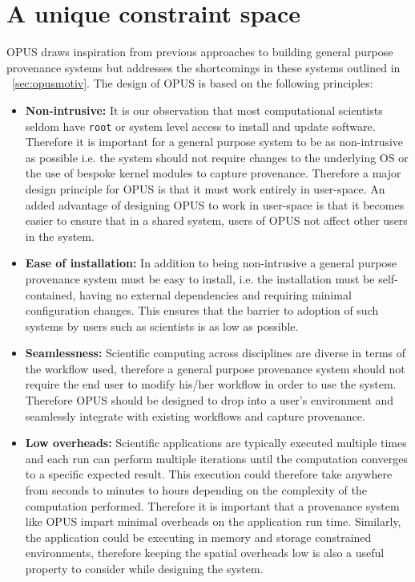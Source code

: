 \documentclass[withindex,glossary]{cam-thesis}
\begin{document}
\section{A unique constraint space}
OPUS draws inspiration from previous approaches to building general purpose provenance systems but addresses the shortcomings in these systems outlined in ~\ref{sec:opusmotiv}. The design of OPUS is based on the following principles:

\begin{itemize}

\item \textbf{Non-intrusive:}
It is our observation that most computational scientists seldom have \texttt{root} or system level access to install and update software. Therefore it is important for a general purpose system to be as non-intrusive as possible i.e. the system should not require changes to the underlying OS or the use of bespoke kernel modules to capture provenance. Therefore a major design principle for OPUS is that it must work entirely in user-space. An added advantage of designing OPUS to work in user-space is that it becomes easier to ensure that in a shared system, users of OPUS not affect other users in the system.

\item \textbf{Ease of installation:}
In addition to being non-intrusive a general purpose provenance system must be easy to install, i.e. the installation must be self-contained, having no external dependencies and requiring minimal configuration changes. This ensures that the barrier to adoption of such systems by users such as scientists is as low as possible.

\item \textbf{Seamlessness:}
Scientific computing across disciplines are diverse in terms of the workflow used, therefore a general purpose provenance system should not require the end user to modify his/her workflow in order to use the system. Therefore OPUS should be designed to drop into a user's environment and seamlessly integrate with existing workflows and capture provenance.

\item \textbf{Low overheads:} 
Scientific applications are typically executed multiple times and each run can perform multiple iterations until the computation converges to a specific expected result. This execution could therefore take anywhere from seconds to minutes to hours depending on the complexity of the computation performed. Therefore it is important that a provenance system like OPUS impart minimal overheads on the application run time. Similarly, the application could be executing in memory and storage constrained environments, therefore keeping the spatial overheads low is also a useful property to consider while designing the system.


\end{itemize}
\end{document}
